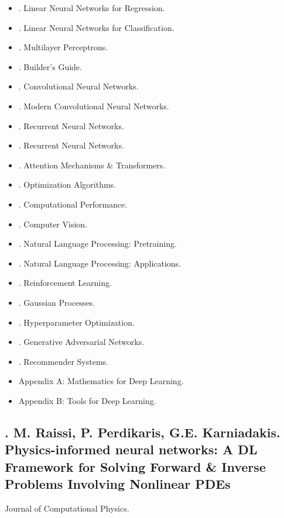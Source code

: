 \documentclass{article}
\begin{document}
\begin{itemize}
\begin{itemize}
\begin{itemize}
		\end{itemize}
	\end{itemize}
	\item {. Linear Neural Networks for Regression.}
	\item {. Linear Neural Networks for Classification.}
	\item {. Multilayer Perceptrons.}
	\item {. Builder's Guide.}
	\item {. Convolutional Neural Networks.}
	\item {. Modern Convolutional Neural Networks.}
	\item {. Recurrent Neural Networks.}
	\item {. Recurrent Neural Networks.}
	\item {. Attention Mechanisms \& Transformers.}
	\item {. Optimization Algorithms.}
	\item {. Computational Performance.}
	\item {. Computer Vision.}
	\item {. Natural Language Processing: Pretraining.}
	\item {. Natural Language Processing: Applications.}
	\item {. Reinforcement Learning.}
	\item {. Gaussian Processes.}
	\item {. Hyperparameter Optimization.}
	\item {. Generative Adversarial Networks.}
	\item {. Recommender Systems.}
	\item {\sf Appendix A: Mathematics for Deep Learning.}
	\item {\sf Appendix B: Tools for Deep Learning.}
\end{itemize}


\subsection{\cite{Raissi_Perdikaris_Karniadakis2019}. {\sc M. Raissi, P. Perdikaris, G.E. Karniadakis}. Physics-informed neural networks: A DL Framework for Solving Forward \& Inverse Problems Involving Nonlinear PDEs}
Journal of Computational Physics. {\sf[12432 citations]}
\end{document}
